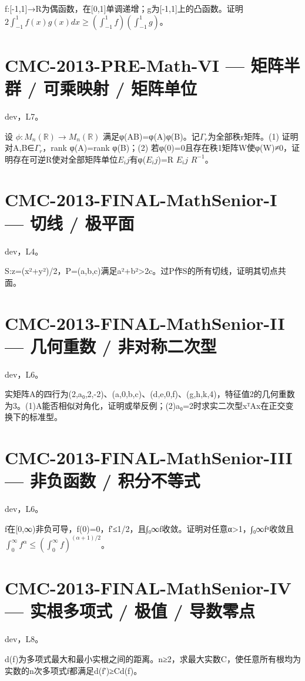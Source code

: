 \documentclass[UTF8]{ctexart}
\begin{document}
f:[-1,1]→R为偶函数，在[0,1]单调递增；g为[-1,1]上的凸函数。证明 $2\int_{-1}^1f(x)g(x)dx\ge(\int_{-1}^1f)(\int_{-1}^1g)$。

\section*{CMC-2013-PRE-Math-VI — 矩阵半群 / 可乘映射 / 矩阵单位}

dev，L7。

设 $\phi:M_n(\mathbb R)\to M_n(\mathbb R)$ 满足φ(AB)=φ(A)φ(B)。记$Γ_r$为全部秩r矩阵。(1) 证明对A,B∈$Γ_r$，rank φ(A)=rank φ(B)；(2) 若φ(0)=0且存在秩1矩阵W使φ(W)≠0，证明存在可逆R使对全部矩阵单位$E_ij$有φ($E_ij$)=R $E_ij$ $R^{-1}$。

\section*{CMC-2013-FINAL-MathSenior-I — 切线 / 极平面}

dev，L4。

S:z=(x²+y²)/2，P=(a,b,c)满足a²+b²>2c。过P作S的所有切线，证明其切点共面。

\section*{CMC-2013-FINAL-MathSenior-II — 几何重数 / 非对称二次型}

dev，L6。

实矩阵A的四行为(2,a₀,2,-2)、(a,0,b,c)、(d,e,0,f)、(g,h,k,4)，特征值2的几何重数为3。(1)A能否相似对角化，证明或举反例；(2)a₀=2时求实二次型xᵀAx在正交变换下的标准型。

\section*{CMC-2013-FINAL-MathSenior-III — 非负函数 / 积分不等式}

dev，L6。

f在[0,∞)非负可导，f(0)=0，f′≤1/2，且∫₀∞f收敛。证明对任意α>1，∫₀∞fᵅ收敛且 $\int_0^\infty f^\alpha\le(\int_0^\infty f)^{(\alpha+1)/2}$。

\section*{CMC-2013-FINAL-MathSenior-IV — 实根多项式 / 极值 / 导数零点}

dev，L8。

d(f)为多项式最大和最小实根之间的距离。n≥2，求最大实数C，使任意所有根均为实数的n次多项式f都满足d(f′)≥Cd(f)。
\end{document}
